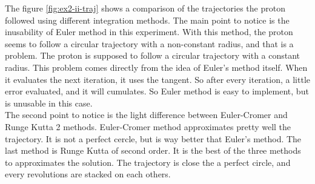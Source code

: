 \documentclass[a4paper,12pt,twoside]{article}
\begin{document}
The figure \ref{fig:ex2-ii-traj} shows a comparison of the trajectories the proton followed using different integration methods.
The main point to notice is the inusability of Euler method in this experiment.
With this method, the proton seems to follow a circular trajectory with a non-constant radius, and that is a problem.
The proton is supposed to follow a circular trajectory with a constant radius.
This problem comes directly from the idea of Euler's method itself.
When it evaluates the next iteration, it uses  the tangent.%
So after every iteration, a little error evaluated, and it will cumulates.
So Euler method is easy to implement, but is unusable in this case.\\

The second point to notice is the light difference between Euler-Cromer and Runge Kutta 2 methods.
Euler-Cromer method approximates pretty well the trajectory.
It is not a perfect cercle, but is way better that Euler's method.
The last method is Runge Kutta of second order.
It is the best of the three methods to approximates the solution.
The trajectory is close the a perfect circle, and every revolutions are stacked on each others.
\end{document}
